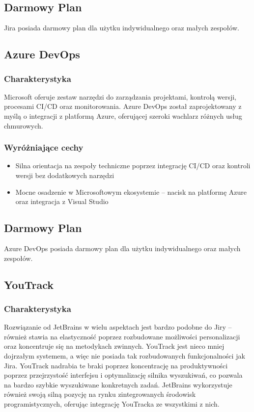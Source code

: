 \subsection*{Darmowy Plan}
Jira posiada darmowy plan dla użytku indywidualnego oraz małych zespołów.

\subsection*{Azure DevOps}
\subsubsection*{Charakterystyka}
Microsoft oferuje zestaw narzędzi do zarządzania projektami, kontrolą wersji, procesami CI/CD oraz monitorowania. Azure DevOps został zaprojektowany z myślą o integracji z platformą Azure, oferującej
szeroki wachlarz różnych usług chmurowych. 
\subsubsection*{Wyróżniające cechy}
\begin{itemize}
    \item Silna orientacja na zespoły techniczne poprzez integrację CI/CD oraz kontroli wersji bez dodatkowych narzędzi
    \item Mocne osadzenie w Microsoftowym ekosystemie -- nacisk na platformę Azure oraz integracja z Visual Studio
\end{itemize}
\subsection*{Darmowy Plan}
Azure DevOps posiada darmowy plan dla użytku indywidualnego oraz małych zespołów.

\subsection*{YouTrack}
\subsubsection*{Charakterystyka}
Rozwiązanie od JetBrains w wielu aspektach jest bardzo podobne do Jiry -- również stawia na elastyczność poprzez rozbudowane możliwości personalizacji oraz koncentruje się na metodykach zwinnych.
YouTrack jest nieco mniej dojrzałym systemem, a więc nie posiada tak rozbudowanych funkcjonalności jak Jira. YouTrack nadrabia te braki poprzez koncentrację na produktywności poprzez przejrzystość
interfejsu i optymalizację silnika wyszukiwań, co pozwala na bardzo szybkie wyszukiwane konkretnych zadań. JetBrains wykorzystuje również swoją silną pozycję na rynku zintegrowanych środowisk programistycznych,
oferując integrację YouTracka ze wszystkimi z nich.
